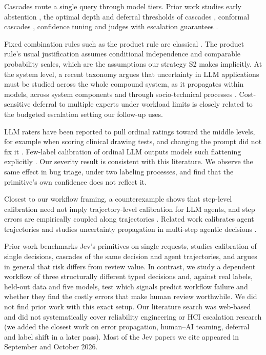  Cascades route a single query
through model tiers. Prior work studies early abstention
\citep{zellinger2025early}, the optimal depth and deferral thresholds of
cascades \citep{bouchard2026escalation}, conformal cascades
\citep{dou2026conformalcascade}, confidence tuning \citep{rabanser2025gatekeeper}
and judges with escalation guarantees \citep{jung2025trust}.

 Fixed combination
rules such as the product rule are classical
\citep{kittler1998combining}. The product rule's usual justification
assumes conditional independence and comparable probability scales,
which are the assumptions our strategy S2 makes implicitly. At
the system level, a recent taxonomy argues that uncertainty in LLM
applications must be studied across the whole compound system, as it
propagates within models, across system components and through
socio-technical processes \citep{xia2026propagation}. Cost-sensitive
deferral to multiple experts under workload limits \citep{alves2024defer}
is closely related to the budgeted escalation setting our follow-up uses.

 LLM raters have been
reported to pull ordinal ratings toward the middle levels, for example
when scoring clinical drawing tests, and changing the prompt did not fix
it \citep{zhang2026centraltendency}. Few-label calibration of ordinal
LLM outputs models such flattening explicitly \citep{wang2026cordial}.
Our severity result is consistent with this literature. We observe the
same effect in bug triage, under two labeling processes, and find that
the primitive's own confidence does not reflect it.

 Closest to our workflow framing, a counterexample
shows that step-level calibration need not imply trajectory-level
calibration for LLM agents, and step errors are empirically coupled along
trajectories \citep{lin2026uqagents}. Related work calibrates agent
trajectories \citep{zhang2026agentic} and studies uncertainty propagation
in multi-step agentic decisions \citep{duan2025uprop}.

 Prior work benchmarks Jev's primitives on single
requests, studies calibration of single decisions, cascades of the
same decision and agent trajectories, and argues in general that
risk differs from review value. In contrast, we study a dependent
workflow of three structurally different typed decisions and,
against real labels, held-out data and five models, test which
signals predict workflow failure and whether they find the costly errors
that make human review worthwhile. We did not find prior work with this
exact setup. Our literature search was web-based and did not
systematically cover reliability engineering or HCI escalation research
(we added the closest work on error propagation, human--AI teaming,
deferral and label shift in a later pass). Most of the Jev papers we cite
appeared in September and October 2026.

